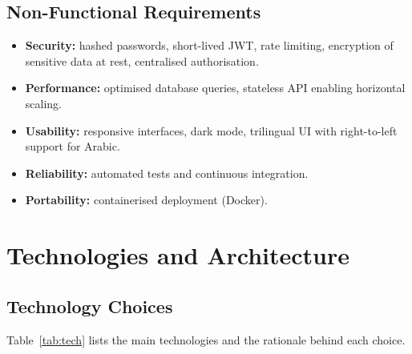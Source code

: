\documentclass[12pt,a4paper,oneside]{report}
\begin{document}
\section{Non-Functional Requirements}
\begin{itemize}[leftmargin=1.4em]
  \item \textbf{Security:} hashed passwords, short-lived JWT, rate limiting,
        encryption of sensitive data at rest, centralised authorisation.
  \item \textbf{Performance:} optimised database queries, stateless API enabling
        horizontal scaling.
  \item \textbf{Usability:} responsive interfaces, dark mode, trilingual UI with
        right-to-left support for Arabic.
  \item \textbf{Reliability:} automated tests and continuous integration.
  \item \textbf{Portability:} containerised deployment (Docker).
\end{itemize}

\chapter{Technologies and Architecture}\label{ch:techarch}
\section{Technology Choices}
Table~\ref{tab:tech} lists the main technologies and the rationale behind each
choice.
\end{document}
